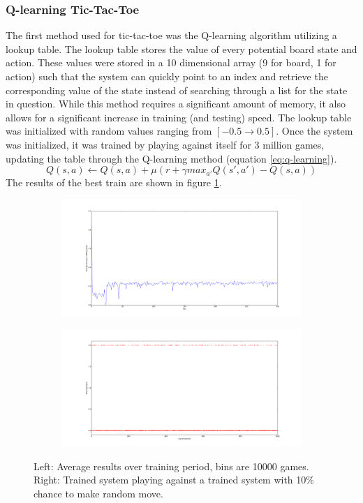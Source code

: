 \documentclass[12pt,a4paper]{article}
\begin{document}
\subsubsection*{Q-learning Tic-Tac-Toe}
The first method used for tic-tac-toe was the Q-learning algorithm utilizing a lookup table. The lookup table stores the value of every potential board state and action. These values were stored in a 10 dimensional array (9 for board, 1 for action) such that the system can quickly point to an index and retrieve the corresponding value of the state instead of searching through a list for the state in question. While this method requires a significant amount of memory, it also allows for a significant increase in training (and testing) speed. The lookup table was initialized with random values ranging from $[-0.5 \rightarrow 0.5]$. Once the system was initialized, it was trained by playing against itself for 3 million games, updating the table through the Q-learning method (equation \ref{eq:q-learning}). 
\begin{equation}
{Q(s,a)} \leftarrow {Q(s,a) + \mu(r + \gamma max_{a'}Q(s',a')-Q(s,a))}
\label{eq:q-learning}
\end{equation}
The results of the best train are shown in figure \ref{fig:training}.
\begin{figure}[h]
\centering
\begin{subfigure}[h]{0.45\textwidth}
\includegraphics[width=\textwidth]{Figures/train01epsilon.png}
\end{subfigure}
\begin{subfigure}[h]{0.45\textwidth}
\includegraphics[width=\textwidth]{Figures/Optimalstateresults.png}
\end{subfigure}
\caption{Left: Average results over training period, bins are 10000 games. Right: Trained system playing against a trained system with 10\% chance to make random move.}
\label{fig:training}
\end{figure}
\end{document}
